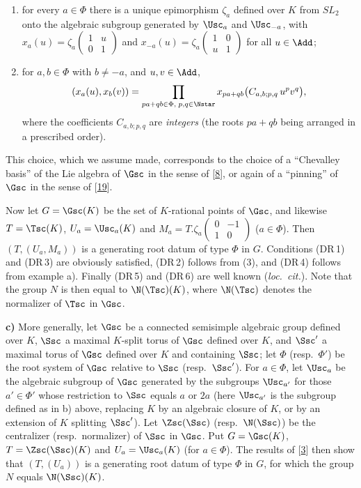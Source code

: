 \documentclass[12pt,a4paper,oneside,english]{smfart}
\newcommand{\btbib}[1]{\hyperlink{bib:#1}{#1}}
\theoremstyle{definition}
\theoremstyle{bt}
\begin{document}
\begin{enumerate}
\item[(2)] for every $a\in\Phi$ there is a unique epimorphism $\zeta_a$ defined
over $K$ from $SL_2$ onto the algebraic subgroup generated by $\Usc_a$ and
$\Usc_{-a}$, with
$x_a(u)=\zeta_a\!\left(\begin{smallmatrix}1&u\\0&1\end{smallmatrix}\right)$ and
$x_{-a}(u)=\zeta_a\!\left(\begin{smallmatrix}1&0\\u&1\end{smallmatrix}\right)$
for all $u\in\Add$;
\item[(3)] for $a,b\in\Phi$ with $b\ne -a$, and $u,v\in\Add$,
\[ (x_a(u),x_b(v))=\prod_{pa+qb\in\Phi,\;p,q\in\Nstar}
   x_{pa+qb}\bigl(C_{a,b;p,q}\,u^{p}v^{q}\bigr), \]
where the coefficients $C_{a,b;p,q}$ are \emph{integers} (the roots $pa+qb$ being
arranged in a prescribed order).
\end{enumerate}

\noindent This choice, which we assume made, corresponds to the choice of a
``Chevalley basis'' of the Lie algebra of $\Gsc$ in the sense of [\btbib{8}], or again of
a ``pinning'' of $\Gsc$ in the sense of [\btbib{19}].

Now let $G=\Gsc(K)$ be the set of $K$-rational points of $\Gsc$, and likewise
$T=\Tsc(K)$, $U_a=\Usc_a(K)$ and
$M_a=T.\zeta_a\!\left(\begin{smallmatrix}0&-1\\1&0\end{smallmatrix}\right)$
($a\in\Phi$). Then $(T,(U_a,M_a))$ is a generating root datum of type $\Phi$ in
$G$. Conditions (DR\,1) and (DR\,3) are obviously satisfied, (DR\,2) follows from
(3), and (DR\,4) follows from example a). Finally (DR\,5) and (DR\,6) are well
known (\emph{loc.\ cit.}). Note that the group $N$ is then equal to
$\N(\Tsc)(K)$, where $\N(\Tsc)$ denotes the normalizer of $\Tsc$ in $\Gsc$.

\medskip
\noindent\textbf{c)} More generally, let $\Gsc$ be a connected semisimple
algebraic group defined over $K$, $\Ssc$ a maximal $K$-split torus of $\Gsc$
defined over $K$, and $\Ssc'$ a maximal torus of $\Gsc$ defined over $K$ and
containing $\Ssc$; let $\Phi$ (resp.\ $\Phi'$) be the root system of $\Gsc$
relative to $\Ssc$ (resp.\ $\Ssc'$). For $a\in\Phi$, let $\Usc_a$ be the
algebraic subgroup of $\Gsc$ generated by the subgroups $\Usc_{a'}$ for those
$a'\in\Phi'$ whose restriction to $\Ssc$ equals $a$ or $2a$ (here $\Usc_{a'}$ is
the subgroup defined as in b) above, replacing $K$ by an algebraic closure of
$K$, or by an extension of $K$ splitting $\Ssc'$). Let $\Zsc(\Ssc)$ (resp.\
$\N(\Ssc)$) be the centralizer (resp.\ normalizer) of $\Ssc$ in $\Gsc$. Put
$G=\Gsc(K)$, $T=\Zsc(\Ssc)(K)$ and $U_a=\Usc_a(K)$ (for $a\in\Phi$). The results
of [\btbib{3}] then show that $(T,(U_a))$ is a generating root datum of type $\Phi$ in
$G$, for which the group $N$ equals $\N(\Ssc)(K)$.
\end{document}
